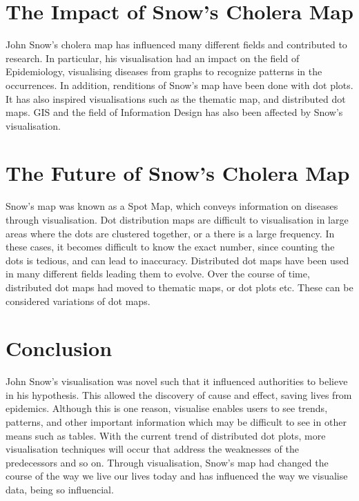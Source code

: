 \documentclass[12pt]{article}
\begin{document}
\section{The Impact of Snow's Cholera Map}
John Snow's cholera map has influenced many different fields and contributed to research. In particular, his visualisation had an impact on the field of Epidemiology, visualising diseases from graphs to recognize patterns in the occurrences. In addition, renditions of Snow's map have been done with dot plots. It has also inspired visualisations such as the thematic map, and distributed dot maps. GIS and the field of Information Design has also been affected by Snow's visualisation. 

\section{The Future of Snow's Cholera Map}
Snow's map was known as a Spot Map, which conveys information on diseases through visualisation. Dot distribution maps are difficult to visualisation in large areas where the dots are clustered together, or a there is a large frequency. In these cases, it becomes difficult to know the exact number, since counting the dots is tedious, and can lead to inaccuracy. Distributed dot maps have been used in many different fields leading them to evolve. Over the course of time, distributed dot maps had moved to thematic maps, or dot plots etc. These can be considered variations of dot maps. 

\section{Conclusion}
John Snow's visualisation was novel such that it influenced authorities to believe in his hypothesis. This allowed the discovery of cause and effect, saving lives from epidemics. Although this is one reason, visualise enables users to see trends, patterns, and other important information which may be difficult to see in other means such as tables. With the current trend of distributed dot plots, more visualisation techniques will occur that address the weaknesses of the predecessors and so on. Through visualisation, Snow's map had changed the course of the way we live our lives today and has influenced the way we visualise data, being so influencial.

% 
% 




\end{document}
